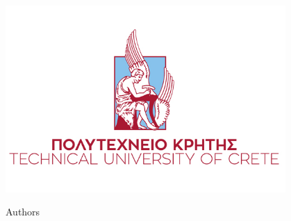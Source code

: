 \begin{titlepage}
    \begin{center}

        \includegraphics[width=0.8\textwidth]{images/TUC2.png}
        
        \vfill

        \Huge
        
        
         \LARGE
        \textbf{\papertitle}
        
        \vfill
        
        \Large
        
        Authors\\
  
        \authorname

        \vspace{1.5cm}

        \large
        \acmodulecode\ \textsc{\acmodulename}
        
        \vspace{0.7cm}
        
        \large
        \textsc{\accollegename}
        
        \vspace{0.7cm}
        
        \Large
        \wrdate
        
    \end{center}
\end{titlepage}
